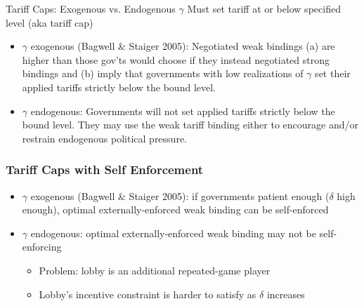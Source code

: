 \documentclass[handout]{beamer}
\newcommand{\bta}{\bm{\tau^a}}
\newcommand{\btn}{\bm{\tau^{tw}}}
\newcommand{\ga}{\gamma}
\newcommand{\de}{\delta}
\begin{document}
{\begin{frame}{Tariff Caps: Exogenous vs. Endogenous $\ga$}
\pause
Must set tariff at or below specified level (aka tariff cap)
\pause
\begin{itemize}[<+->]
	\item $\ga$ exogenous (Bagwell $\&$ Staiger 2005): Negotiated weak bindings (a) are higher than those gov'ts would choose if they instead negotiated strong bindings and (b) imply that governments with low realizations of $\ga$ set their applied tariffs strictly below the bound level.

	\item $\ga$ endogenous: Governments will not set applied tariffs strictly below the bound level. They may use the weak tariff binding either to encourage and/or restrain endogenous political pressure.

\end{itemize}
\end{frame}


\begin{frame}[label=self]
\frametitle{Tariff Caps with Self Enforcement}
\pause
\begin{itemize}[<+->]
	\item $\ga$ exogenous (Bagwell $\&$ Staiger 2005): if governments patient enough ($\de$ high enough), optimal externally-enforced weak binding can be self-enforced
  \item $\ga$ endogenous: optimal externally-enforced weak binding may not be self-enforcing
		\begin{itemize}
			\item Problem: lobby is an additional repeated-game player
			\item Lobby's incentive constraint is harder to satisfy as $\de$ increases
		\end{itemize}
	 
\end{itemize}
\pause
\hyperlink{repeated<1>}{}
\end{frame}




}
\end{document}
